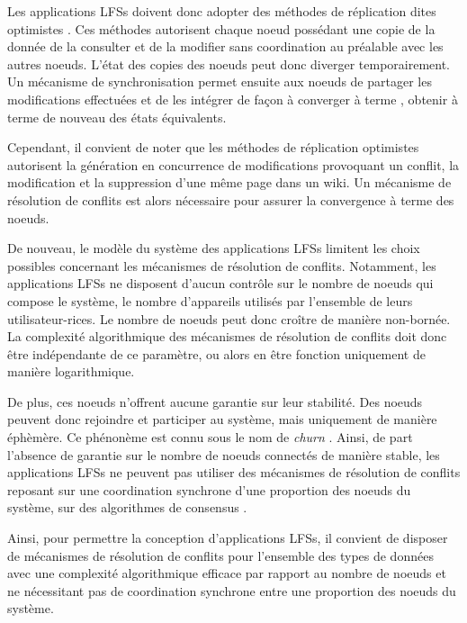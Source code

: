 Les applications \acp{LFS} doivent donc adopter des méthodes de réplication dites optimistes \cite{2005-optimistic-replication-saito}.
Ces méthodes autorisent chaque noeud possédant une copie de la donnée de la consulter et de la modifier sans coordination au préalable avec les autres noeuds.
L'état des copies des noeuds peut donc diverger temporairement.
Un mécanisme de synchronisation permet ensuite aux noeuds de partager les modifications effectuées et de les intégrer de façon à converger à terme \cite{10.1145/224057.224070}, \ie obtenir à terme de nouveau des états équivalents.

Cependant, il convient de noter que les méthodes de réplication optimistes autorisent la génération en concurrence de modifications provoquant un conflit, \eg la modification et la suppression d'une même page dans un wiki.
Un mécanisme de résolution de conflits est alors nécessaire pour assurer la convergence à terme des noeuds.

De nouveau, le modèle du système des applications \acp{LFS} limitent les choix possibles concernant les mécanismes de résolution de conflits.
Notamment, les applications \acp{LFS} ne disposent d'aucun contrôle sur le nombre de noeuds qui compose le système, \ie le nombre d'appareils utilisés par l'ensemble de leurs utilisateur-rices.
Le nombre de noeuds peut donc croître de manière non-bornée.
La complexité algorithmique des mécanismes de résolution de conflits doit donc être indépendante de ce paramètre, ou alors en être fonction uniquement de manière logarithmique.

De plus, ces noeuds n'offrent aucune garantie sur leur stabilité.
Des noeuds peuvent donc rejoindre et participer au système, mais uniquement de manière éphèmère.
Ce phénonème est connu sous le nom de \emph{churn} \cite{understandingChurnP2PNetworks2006}.
Ainsi, de part l'absence de garantie sur le nombre de noeuds connectés de manière stable, les applications \acp{LFS} ne peuvent pas utiliser des mécanismes de résolution de conflits reposant sur une coordination synchrone d'une proportion des noeuds du système, \ie sur des algorithmes de consensus \cite{1998-paxos-lamport, 2014-raft-ongaro}.

Ainsi, pour permettre la conception d'applications \acp{LFS}, il convient de disposer de mécanismes de résolution de conflits pour l'ensemble des types de données avec une complexité algorithmique efficace par rapport au nombre de noeuds et ne nécessitant pas de coordination synchrone entre une proportion des noeuds du système.

